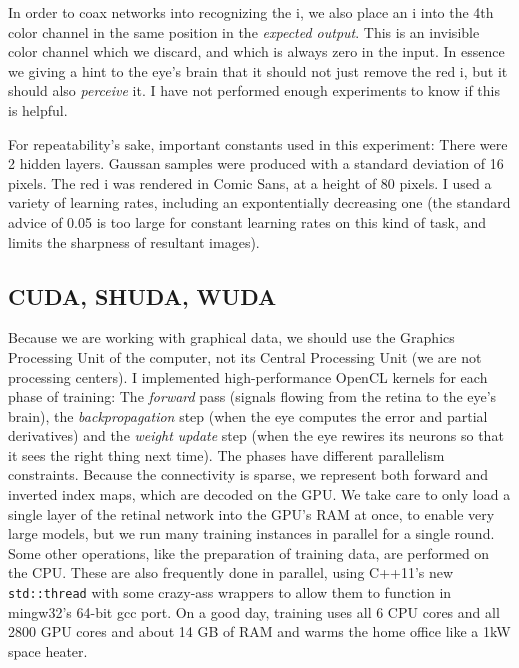 \documentclass[twocolumn]{article}
\begin{document}

In order to coax networks into recognizing the i, we also place an i
into the 4th color channel in the same position in the {\em expected
output}. This is an invisible color channel which we discard, and
which is always zero in the input. In essence we giving a hint to the
eye's brain that it should not just remove the red i, but it should
also {\em perceive} it. I have not performed enough experiments to
know if this is helpful.

For repeatability's sake, important constants used in this experiment:
There were 2 hidden layers. Gaussan samples were produced with a
standard deviation of 16 pixels. The red i was rendered in Comic Sans,
at a height of 80 pixels. I used a variety of learning rates,
including an expontentially decreasing one (the standard advice of
0.05 is too large for constant learning rates on this kind of task, and
limits the sharpness of resultant images).

\subsection{CUDA, SHUDA, WUDA}

Because we are working with graphical data, we should use the Graphics
Processing Unit of the computer, not its Central Processing Unit (we
are not processing centers). I implemented high-performance OpenCL
kernels for each phase of training: The {\em forward} pass (signals
flowing from the retina to the eye's brain), the {\em backpropagation}
step (when the eye computes the error and partial derivatives) and the
{\em weight update} step (when the eye rewires its neurons so that it
sees the right thing next time). The phases have different parallelism
constraints. Because the connectivity is sparse, we represent both
forward and inverted index maps, which are decoded on the GPU. We take
care to only load a single layer of the retinal network into the GPU's
RAM at once, to enable very large models, but we run many training
instances in parallel for a single round. Some other operations, like
the preparation of training data, are performed on the CPU. These are
also frequently done in parallel, using C++11's new {\tt std::thread}
with some crazy-ass wrappers to allow them to function in mingw32's
64-bit gcc port. On a good day, training uses all 6 CPU cores and all
2800 GPU cores and about 14 GB of RAM and warms the home office like a
1kW space heater.
\end{document}
